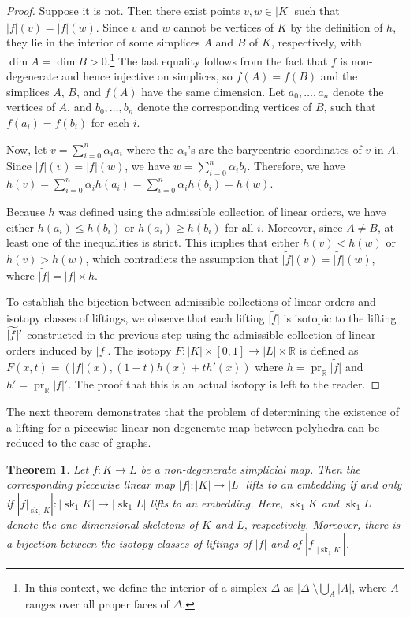 \documentclass[a4paper,12pt,reqno,oneside]{amsart}
\theoremstyle{plain}
\newtheorem{theorem}{Theorem}
\theoremstyle{definition}
\theoremstyle{plain}
\newcommand{\from}{\colon}
\newcommand{\wt}[1]{\widetilde{#1}}
\newcommand{\R}{\mathbb{R}}
\DeclareMathOperator{\pr}{pr}
\DeclareMathOperator{\sk}{sk}
\begin{document}
\begin{proof}
  Suppose it is not. Then there exist points $v, w \in |K|$ such that $\wt{|f|}(v) =
  \wt{|f|}(w)$. Since $v$ and $w$ cannot be vertices of $K$ by the definition of $h$, they lie
  in the interior of some simplices $A$ and $B$ of $K$, respectively, with
  $\dim A = \dim B > 0$.\footnote{In this context, we define the interior of a simplex $\Delta$ as
    $|\Delta| \setminus \bigcup_{A} |A|$, where $A$ ranges over all proper faces of $\Delta$.} The last
  equality follows from the fact that $f$ is non-degenerate and hence injective on simplices, so
  $f(A) = f(B)$ and the simplices $A$, $B$, and $f(A)$ have the same dimension. Let
  $a_0, \dots, a_n$ denote the vertices of $A$, and $b_0, \dots, b_n$ denote the corresponding
  vertices of $B$, such that $f(a_i) = f(b_i)$ for each $i$.

  Now, let $v = \sum_{i=0}^n \alpha_i a_i$ where the $\alpha_i$'s are the barycentric coordinates of $v$ in
  $A$. Since $|f|(v) = |f|(w)$, we have $w = \sum_{i=0}^n \alpha_i b_i$. Therefore, we have $h(v) = \sum_{i=0}^n
  \alpha_i h(a_i) = \sum_{i=0}^n \alpha_i h(b_i) = h(w)$.

  Because $h$ was defined using the admissible collection of linear orders, we have either
  $h(a_i) \leq h(b_i)$ or $h(a_i) \geq h(b_i)$ for all $i$. Moreover, since $A \neq B$, at least one
  of the inequalities is strict. This implies that either $h(v) < h(w)$ or $h(v) > h(w)$, which
  contradicts the assumption that $\wt{|f|}(v) = \wt{|f|}(w)$, where $\wt{|f|} = |f| \times h$.

  To establish the bijection between admissible collections of linear orders and isotopy classes of
  liftings, we observe that each lifting $\wt{|f|}$ is isotopic to the lifting
  $\wt{|f|}\vphantom{f}'$ constructed in the previous step using the admissible collection of linear
  orders induced by $\wt{|f|}$. The isotopy $F \from |K| \times [0, 1] \to |L| \times \R$ is defined
  as $F(x, t) = \left(|f|(x), (1-t)h(x) + t h'(x)\right)$ where $h = \pr_\R \wt{|f|}$ and
  $h' = \pr_\R \wt{|f|'}$. The proof that this is an actual isotopy is left to the reader.
\end{proof}

The next theorem demonstrates that the problem of determining the existence of a lifting for a
piecewise linear non-degenerate map between polyhedra can be reduced to the case of graphs.

\begin{theorem}\label{thm:lifting_sk}
  Let $f \from K \to L$ be a non-degenerate simplicial map. Then the corresponding piecewise linear
  map $|f| \from |K| \to |L|$ lifts to an embedding if and only if
  $\left|f \big|_{\sk_1 K}\right| \from |\sk_1 K| \to |\sk_1 L|$ lifts to an embedding. Here, $\sk_1 K$ and
  $\sk_1 L$ denote the one-dimensional skeletons of $K$ and $L$, respectively. Moreover, there is a
  bijection between the isotopy classes of liftings of $|f|$ and of $\left|f \big|_{|\sk_1 K|}\right|$.
\end{theorem}
\end{document}
